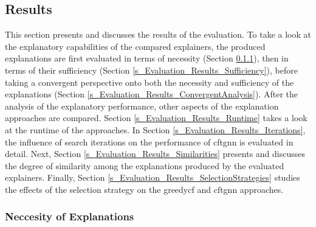 \FloatBarrier
\subsection{Results}
\label{s_Evaluation_Results}

This section presents and discusses the results of the evaluation. To take a look at the explanatory capabilities of the compared explainers, the produced explanations are first evaluated in terms of necessity (Section \ref{s_Evaluation_Results_Neccesity}), then in terms of their sufficiency (Section \ref{s_Evaluation_Results_Sufficiency}), before taking a convergent perspective onto both the necessity and sufficiency of the explanations (Section \ref{s_Evaluation_Results_ConvergentAnalysis}). After the analysis of the explanatory performance, other aspects of the explanation approaches are compared. Section \ref{s_Evaluation_Results_Runtime} takes a look at the runtime of the approaches. In Section \ref{s_Evaluation_Results_Iterations}, the influence of search iterations on the performance of \gls{cftgnn} is evaluated in detail. Next, Section \ref{s_Evaluation_Results_Similarities} presents and discusses the degree of similarity among the explanations produced by the evaluated explainers. Finally, Section \ref{s_Evaluation_Results_SelectionStrategies} studies the effects of the selection strategy on the \gls{greedycf} and \gls{cftgnn} approaches.


 
\FloatBarrier
\subsubsection{Neccesity of Explanations}
\label{s_Evaluation_Results_Neccesity}

